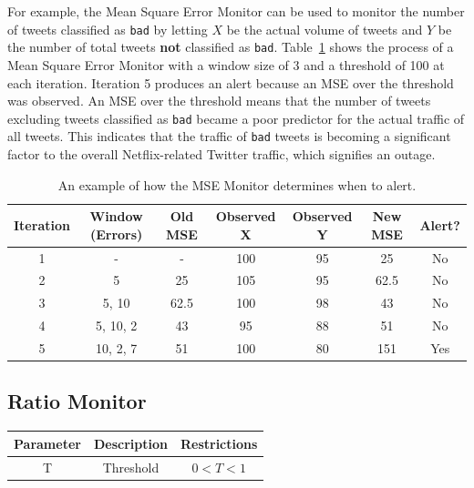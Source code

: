\documentclass[12pt]{ucthesis}
\begin{document}
For example, the Mean Square Error Monitor can be used to monitor the number of tweets classified as \texttt{bad} by letting $X$ be the actual volume of tweets and $Y$ be the number of total tweets \textbf{not} classified as \texttt{bad}.
Table~\ref{table:mseEx} shows the process of a Mean Square Error Monitor with a window size of 3 and a threshold of 100 at each iteration.
Iteration 5 produces an alert because an MSE over the threshold was observed.
An MSE over the threshold means that the number of tweets excluding tweets classified as \texttt{bad} became a poor predictor for the actual traffic of all tweets.
This indicates that the traffic of \texttt{bad} tweets is becoming a significant factor to the overall Netflix-related Twitter traffic, which signifies an outage.

\begin{table}[H]
   \begin{center}
      \begin{tabular}{|c|c|c|c|c|c|c|}
         \hline
            Iteration & Window (Errors) & Old MSE & Observed X & Observed Y & New MSE & Alert?
         \tabularnewline\hline
            1 & - & - & 100 & 95 & 25 & No
         \tabularnewline\hline
            2 & 5 & 25 & 105 & 95 & 62.5 & No
         \tabularnewline\hline
            3 & 5, 10 & 62.5 & 100 & 98 & 43 & No
         \tabularnewline\hline
            4 & 5, 10, 2 & 43 & 95 & 88 & 51 & No
         \tabularnewline\hline
            5 & 10, 2, 7 & 51 & 100 & 80 & 151 & Yes
         \tabularnewline\hline
      \end{tabular}
   \end{center}
   \caption[MSE Monitor Example]{An example of how the MSE Monitor determines when to alert.}
   \label{table:mseEx}
\end{table}

\subsection{Ratio Monitor}
\label{outage-detection-monitors-Ratio}
\begin{table}[H]
   \begin{center}
      \begin{tabular}{|c|c|c|}
         \hline
            Parameter & Description & Restrictions \\
         \hline
            T & Threshold & $ 0 < T < 1 $\\
         \hline
      \end{tabular}
   \end{center}
\end{table}
\end{document}
